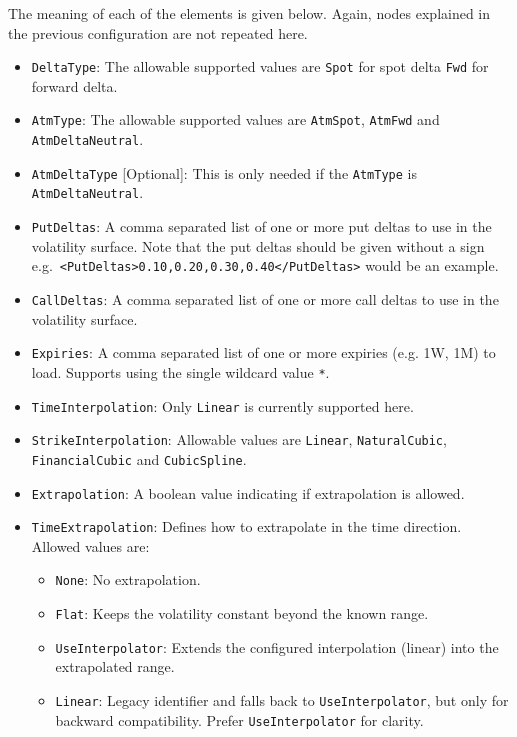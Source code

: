 The meaning of each of the elements is given below. Again, nodes explained in the previous configuration are not repeated here.
\begin{itemize}
\item \lstinline!DeltaType!:
The allowable supported values are \lstinline!Spot! for spot delta \lstinline!Fwd! for forward delta.

\item \lstinline!AtmType!:
The allowable supported values are \lstinline!AtmSpot!, \lstinline!AtmFwd! and \lstinline!AtmDeltaNeutral!.

\item \lstinline!AtmDeltaType! [Optional]:
This is only needed if the \lstinline!AtmType! is \lstinline!AtmDeltaNeutral!.

\item \lstinline!PutDeltas!:
A comma separated list of one or more put deltas to use in the volatility surface. Note that the put deltas should be given without a sign e.g.\ \lstinline!<PutDeltas>0.10,0.20,0.30,0.40</PutDeltas>! would be an example.

\item \lstinline!CallDeltas!:
A comma separated list of one or more call deltas to use in the volatility surface.

\item \lstinline!Expiries!:
A comma separated list of one or more expiries (e.g. 1W, 1M) to load. Supports using the single wildcard value \lstinline!*!.

\item \lstinline!TimeInterpolation!:
Only \lstinline!Linear! is currently supported here.

\item \lstinline!StrikeInterpolation!:
Allowable values are \lstinline!Linear!, \lstinline!NaturalCubic!, \lstinline!FinancialCubic! and \lstinline!CubicSpline!.

\item \lstinline!Extrapolation!:
A boolean value indicating if extrapolation is allowed.

\item \lstinline!TimeExtrapolation!:
Defines how to extrapolate in the time direction. Allowed values are:
  \begin{itemize}
    \item \lstinline!None!: No extrapolation.
    \item \lstinline!Flat!: Keeps the volatility constant beyond the known range.
    \item \lstinline!UseInterpolator!: Extends the configured interpolation (linear) into the extrapolated range.
    \item \lstinline!Linear!: Legacy identifier and falls back to \lstinline!UseInterpolator!, but only for backward compatibility. Prefer \lstinline!UseInterpolator! for clarity.
  \end{itemize}
  

\end{itemize}
